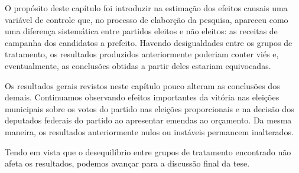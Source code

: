 O propósito deste capítulo foi introduzir na estimação dos efeitos causais uma variável de controle que, no processo de elaborção da pesquisa, apareceu como uma diferença sistemática entre partidos eleitos e não eleitos: as receitas de campanha dos candidatos a prefeito. Havendo desigualdades entre os grupos de tratamento, os resultados produzidos anteriormente poderiam conter viés e, eventualmente, as conclusões obtidas a partir deles estariam equivocadas.

Os resultados gerais revistos neste capítulo pouco alteram as conclusões dos demais. Continuamos observando efeitos importantes da vitória nas eleições municipais sobre os votos do partido nas eleições proporcionais e na decisão dos deputados federais do partido ao apresentar emendas ao orçamento. Da mesma maneira, os resultados anteriormente nulos ou instáveis permancem inalterados.

Tendo em vista que o desequilíbrio entre grupos de tratamento encontrado não afeta os resultados, podemos avançar para a discussão final da tese.